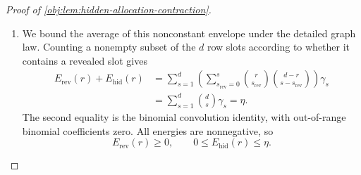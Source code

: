 \begin{proof}[Proof of \cref{obj:lem:hidden-allocation-contraction}]
\begin{enumerate}
Since the \(R_\ell\) are disjoint, each global revealed subset \(J\) corresponds bijectively to its rowwise subsets \(J\cap R_\ell\).
For a row in \(\mathcal B_J\), summing over its nonempty revealed subsets gives
\[
\sum_{\substack{J_\ell\subseteq R_\ell\\J_\ell\ne\varnothing}}
\sum_{k_\ell=0}^{u_\ell}
\binom{u_\ell}{k_\ell}\gamma_{|J_\ell|+k_\ell}
=
E_{\mathrm{rev}}(r_\ell).
\]
For a hidden-active row, its factor is \(E_{\mathrm{hid}}(r_\ell)\).
It follows that
\[
\mathcal A_H
=
\sum_{\substack{
\mathcal B_{\mathrm{rev}},\mathcal B_{\mathrm{hid}}
\subseteq\{1,\ldots,B\}\\
\mathcal B_{\mathrm{rev}}\cap\mathcal B_{\mathrm{hid}}=\varnothing}}
\rho_{|\mathcal B_{\mathrm{rev}}|,|\mathcal B_{\mathrm{hid}}|}^{|\mathcal B_{\mathrm{hid}}|}
\prod_{\ell\in\mathcal B_{\mathrm{rev}}}E_{\mathrm{rev}}(r_\ell)
\prod_{\ell\in\mathcal B_{\mathrm{hid}}}E_{\mathrm{hid}}(r_\ell).
\]
The pair of empty row sets contributes exactly one. Removing it gives
\[
\begin{aligned}
\mathcal A_H-1
=
\sum_{\substack{
\mathcal B_{\mathrm{rev}}\cap\mathcal B_{\mathrm{hid}}=\varnothing\\
|\mathcal B_{\mathrm{rev}}|+|\mathcal B_{\mathrm{hid}}|>0}}
&\rho_{|\mathcal B_{\mathrm{rev}}|,|\mathcal B_{\mathrm{hid}}|}^{|\mathcal B_{\mathrm{hid}}|}
\\
&{}\times
\prod_{\ell\in\mathcal B_{\mathrm{rev}}}E_{\mathrm{rev}}(r_\ell)
\prod_{\ell\in\mathcal B_{\mathrm{hid}}}E_{\mathrm{hid}}(r_\ell).
\end{aligned}
\]
The row sets in this display are subsets of \(\{1,\ldots,B\}\).

\item We bound the average of this nonconstant envelope under the detailed graph law. Counting a nonempty subset of the \(d\) row slots according to whether it contains a revealed slot gives
\[
\begin{aligned}
E_{\mathrm{rev}}(r)+E_{\mathrm{hid}}(r)
&=
\sum_{s=1}^d
\left(
\sum_{s_{\mathrm{rev}}=0}^s
\binom r{s_{\mathrm{rev}}}
\binom{d-r}{s-s_{\mathrm{rev}}}
\right)\gamma_s
\\
&=
\sum_{s=1}^d\binom ds\gamma_s=\eta.
\end{aligned}
\]
The second equality is the binomial convolution identity, with out-of-range binomial coefficients zero. All energies are nonnegative, so
\[
E_{\mathrm{rev}}(r)\ge0,
\qquad
0\le E_{\mathrm{hid}}(r)\le\eta.
\]


\end{enumerate}
\end{proof}
